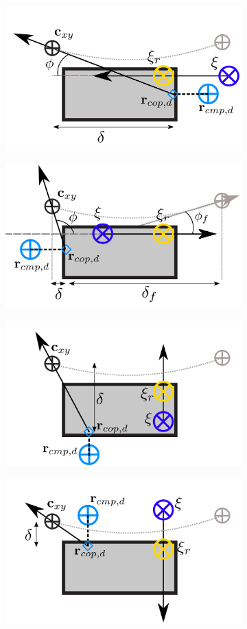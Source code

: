 \begin{figure}[h]
\begin{subfigure}{0.49\textwidth}
  \centering
  \includegraphics[width=.7\linewidth]{STYLESTUFF/ICPplanStartSSPhiVizNegError.png}
   \caption{}
    \label{fig:phiViza}
  \end{subfigure}
  \begin{subfigure}{0.49\textwidth}
    \centering
  \includegraphics[width=.7\linewidth]{STYLESTUFF/ICPplanStartSSPhiViz.png}
  \caption{}
   \label{fig:phiVizb}
  \end{subfigure}
    \begin{subfigure}{0.49\textwidth}
    \centering
  \includegraphics[width=.7\linewidth]{STYLESTUFF/ICPplanStartSSPhiVizLeftError.png}
    \caption{}
     \label{fig:phiVize}
  \end{subfigure}
  \begin{subfigure}{0.49\textwidth}
    \centering
  \includegraphics[width=.7\linewidth]{STYLESTUFF/ICPplanStartSSPhiVizRightError.png}

\end{subfigure}
\end{figure}
